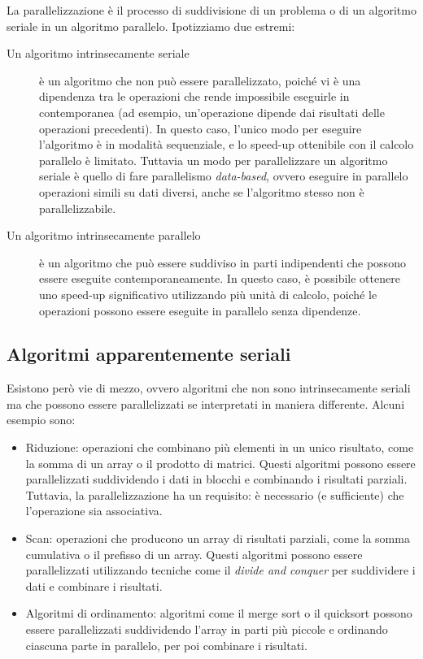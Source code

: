 La parallelizzazione è il processo di suddivisione di un problema o di un algoritmo seriale in un algoritmo parallelo. Ipotizziamo due estremi:
\begin{description}
    \item[Un algoritmo intrinsecamente seriale] è un algoritmo che non può essere parallelizzato, poiché vi è una dipendenza tra le operazioni che rende impossibile eseguirle in contemporanea (ad esempio, un'operazione dipende dai risultati delle operazioni precedenti). In questo caso, l'unico modo per eseguire l'algoritmo è in modalità sequenziale, e lo speed-up ottenibile con il calcolo parallelo è limitato. Tuttavia un modo per parallelizzare un algoritmo seriale è quello di fare parallelismo \emph{data-based}, ovvero eseguire in parallelo operazioni simili su dati diversi, anche se l'algoritmo stesso non è parallelizzabile.
    \item[Un algoritmo intrinsecamente parallelo] è un algoritmo che può essere suddiviso in parti indipendenti che possono essere eseguite contemporaneamente. In questo caso, è possibile ottenere uno speed-up significativo utilizzando più unità di calcolo, poiché le operazioni possono essere eseguite in parallelo senza dipendenze.
\end{description}

\subsection{Algoritmi apparentemente seriali}

Esistono però vie di mezzo, ovvero algoritmi che non sono intrinsecamente seriali ma che possono essere parallelizzati se interpretati in maniera differente. Alcuni esempio sono:
\begin{itemize}
    \item Riduzione: operazioni che combinano più elementi in un unico risultato, come la somma di un array o il prodotto di matrici. Questi algoritmi possono essere parallelizzati suddividendo i dati in blocchi e combinando i risultati parziali. Tuttavia, la parallelizzazione ha un requisito: è necessario (e sufficiente) che l’operazione sia associativa.
    \item Scan: operazioni che producono un array di risultati parziali, come la somma cumulativa o il prefisso di un array. Questi algoritmi possono essere parallelizzati utilizzando tecniche come il \emph{divide and conquer} per suddividere i dati e combinare i risultati.
    \item Algoritmi di ordinamento: algoritmi come il merge sort o il quicksort possono essere parallelizzati suddividendo l'array in parti più piccole e ordinando ciascuna parte in parallelo, per poi combinare i risultati.
\end{itemize}

